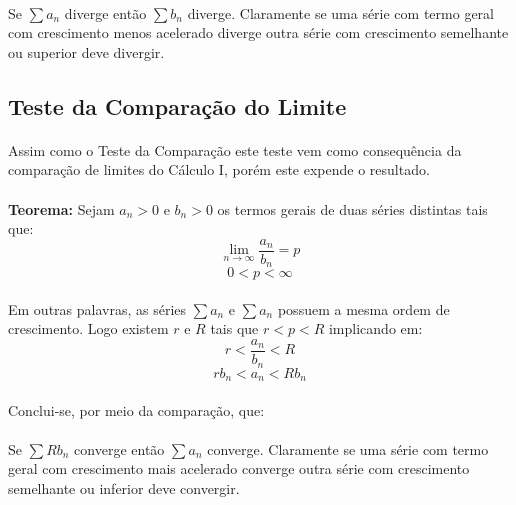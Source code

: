 \documentclass{article}
\begin{document}
            \paragraph{}Se $\sum a_{n}$ diverge então $\sum b_{n}$ diverge. Claramente se uma série com termo geral com crescimento menos acelerado diverge outra série com crescimento semelhante ou superior deve divergir.
        \subsection{Teste da Comparação do Limite}
            \paragraph{}Assim como o Teste da Comparação este teste vem como consequência da comparação de limites do Cálculo I, porém este expende o resultado.
            \paragraph{}\textbf{Teorema:} Sejam $a_{n}>0$ e $b_{n}>0$ os termos gerais de duas séries distintas tais que:
                \begin{equation}
                    \lim_{n\to\infty}\frac{a_{n}}{b_{n}}=p
                \end{equation}
                \begin{equation}
                    0<p<\infty
                \end{equation}
            \paragraph{}Em outras palavras, as séries $\sum a_{n}$ e $\sum a_{n}$ possuem a mesma ordem de crescimento. Logo existem $r$ e $R$ tais que $r<p<R$ implicando em:
                \begin{equation}
                    r<\frac{a_{n}}{b_{n}}<R
                \end{equation}
                \begin{equation}
                    rb_{n}<a_{n}<Rb_{n}
                \end{equation}
            \paragraph{}Conclui-se, por meio da comparação, que:
            \paragraph{}Se $\sum Rb_{n}$ converge então $\sum a_{n}$ converge. Claramente se uma série com termo geral com crescimento mais acelerado converge outra série com crescimento semelhante ou inferior deve convergir.
\end{document}
